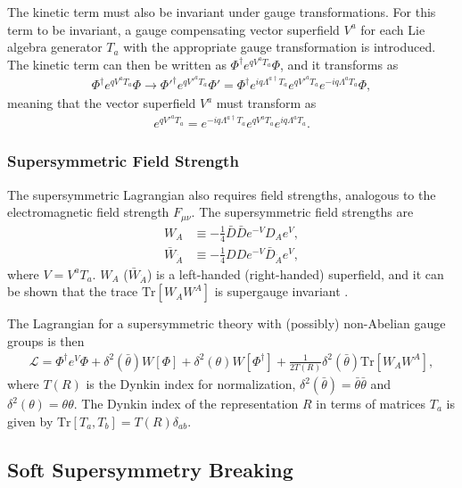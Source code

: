 \documentclass[twoside,english]{uiofysmaster}
\begin{document}
The kinetic term must also be invariant under gauge transformations. For this term to be invariant, a gauge compensating vector superfield $V^a$ for each Lie algebra generator $T_a$ with the appropriate gauge transformation is introduced. The kinetic term can then be written as $\Phi^{\dagger} e^{qV^aT_a} \Phi$, and it transforms as
\begin{align}
\Phi^{\dagger} e^{qV^aT_a} \Phi \rightarrow {\Phi'}^{\dagger} e^{q{V'}^aT_a} \Phi' = \Phi^{\dagger} e^{iq\Lambda^{a \dagger} T_a} e^{q{V'}^aT_a} e^{-iq \Lambda^a T_a} \Phi,
\end{align}
meaning that the vector superfield $V^a$ must transform as
\begin{align}
e^{q{V'}^a T_a} = e^{-iq \Lambda^{a \dagger} T_a} e^{qV^aT_a} e^{iq\Lambda^a T_a}.
\end{align}

\subsubsection{Supersymmetric Field Strength}

The supersymmetric Lagrangian also requires field strengths, analogous to the electromagnetic field strength $F_{\mu \nu}$. The supersymmetric field strengths are 
\begin{align}
W_A & \equiv - \frac{1}{4} \bar{D} \bar{D} e^{-V} D_A e^V,\\
\bar{W}_{\dot{A}} & \equiv - \frac{1}{4} DDe^{-V}\bar{D}_{\dot{A}} e^V,
\end{align}
where $V = V^a T_a$. $W_A$ ($\bar{W}_{\dot{A}}$) is a left-handed (right-handed) superfield, and it can be shown that the trace $\text{Tr}[W_AW^A]$ is supergauge invariant \cite{batzing2017lecture}. 

The Lagrangian for a supersymmetric theory with (possibly) non-Abelian gauge groups is then
\begin{align}
\mathcal{L} = \Phi^{\dagger} e^{V} \Phi + \delta^2 (\bar{\theta}) W[\Phi] + \delta^2 (\theta) W[\Phi^{\dagger}] + \frac{1}{2T(R)} \delta^2 (\bar{\theta}) \text{Tr}[W_AW^A],
\end{align}
where $T(R)$ is the Dynkin index for normalization, $\delta^2(\bar{\theta}) = \bar{\theta} \bar{\theta}$ and $\delta^2(\theta) = \theta \theta$. The Dynkin index of the representation $R$ in terms of matrices $T_a$ is given by $\text{Tr}[T_a, T_b] = T(R) \delta_{ab}$.

\subsection{Soft Supersymmetry Breaking}\label{Sec:: phys back : Soft Supersymmetry Breaking}
\end{document}
